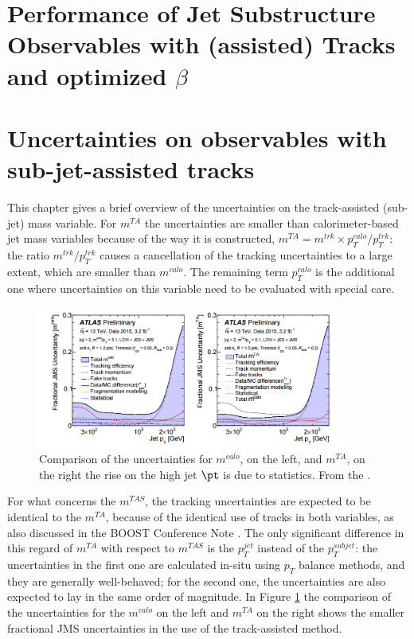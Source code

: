 \documentclass[UKenglish,texlive=2013]{\ATLASLATEXPATH atlasdoc}
\newcommand{\mta}{m^{TA}}
\newcommand{\mtas}{m^{TAS}}
\newcommand{\mcal}{m^{calo}}
\begin{document}
\section{Performance of Jet Substructure Observables with (assisted) Tracks and optimized $\beta$}\label{sec:beta_opt}



\clearpage
\section{Uncertainties on observables with sub-jet-assisted tracks}
This chapter gives a brief overview of the uncertainties on the track-assisted (sub-jet) mass variable. 
For $\mta$ the uncertainties are smaller than calorimeter-based jet mass variables because of the way it is constructed, $\mta=m^{trk}\times p_T^{calo}/p_T^{trk}$: the ratio $m^{trk}/p_T^{trk}$ causes a cancellation of the tracking uncertainties to a large extent, which are smaller than $\mcal$. The remaining term $p_T^{calo}$ is the additional one where uncertainties on this variable need to be evaluated with special care.

\begin{figure}[!ht]
  \centering
      \includegraphics[width=0.9\textwidth]{jet_part/uncert.png}
  \caption[Comparison of the uncertainties for $\mcal$ and $\mta$]{Comparison of the uncertainties for $\mcal$, on the left, and $\mta$, on the right the rise on the high jet $\pt$ is due to statistics. From the \cite{art35}.}
  \label{fig:uncert}
\end{figure}


For what concerns the $\mtas$, the tracking uncertainties are expected to be identical to the $\mta$, because of the identical use of tracks in both variables, as also discussed in the BOOST Conference Note \cite{art35}.
The only significant difference in this regard of $\mta$ with respect to $\mtas$ is the $p_T^{jet}$ instead of the $p_T^{subjet}$: the uncertainties in the first one are calculated in-situ using $p_T$ balance methods, and they are generally well-behaved; for the second one, the uncertainties are also expected to lay in the same order of magnitude. In Figure \ref{fig:uncert} the comparison of the uncertainties for the $\mcal$ on the left and $\mta$ on the right shows the smaller fractional JMS uncertainties in the use of the track-assisted method.
\end{document}
